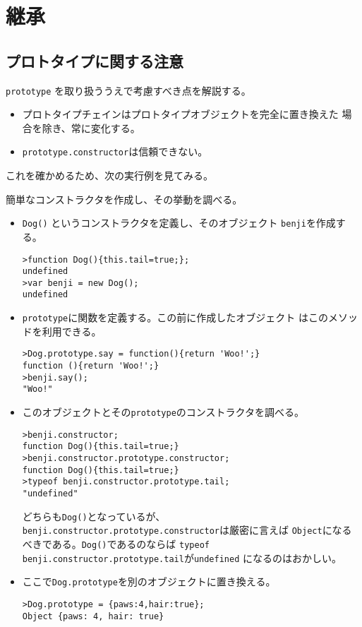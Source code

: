 \chapter{継承}
\section{プロトタイプに関する注意}
\texttt{prototype} を取り扱ううえで考慮すべき点を解説する。
\begin{itemize}
 \item プロトタイプチェインはプロトタイプオブジェクトを完全に置き換えた
       場合を除き、常に変化する。
 \item \texttt{prototype.constructor}は信頼できない。
\end{itemize}
これを確かめるため、次の実行例を見てみる。
\begin{Exec}\upshape
簡単なコンストラクタを作成し、その挙動を調べる。
\begin{itemize}
 \item \texttt{Dog()} というコンストラクタを定義し、そのオブジェクト
 \texttt{benji}を作成する。
\begin{verbatim}
>function Dog(){this.tail=true;};
undefined
>var benji = new Dog();
undefined
\end{verbatim}
 \item \texttt{prototype}に関数を定義する。この前に作成したオブジェクト
       はこのメソッドを利用できる。
\begin{verbatim}
>Dog.prototype.say = function(){return 'Woo!';}
function (){return 'Woo!';}
>benji.say();
"Woo!"
\end{verbatim}
 \item このオブジェクトとその\texttt{prototype}のコンストラクタを調べる。
\begin{verbatim}
>benji.constructor;
function Dog(){this.tail=true;}
>benji.constructor.prototype.constructor;
function Dog(){this.tail=true;}
>typeof benji.constructor.prototype.tail;
"undefined"
\end{verbatim}
どちらも\texttt{Dog()}となっているが、
       \texttt{benji.constructor.prototype.constructor}は厳密に言えば
       \texttt{Object}になるべきである。\texttt{Dog()}であるのならば
       \texttt{typeof benji.constructor.prototype.tail}が\texttt{undefined}
       になるのはおかしい。
 \item ここで\texttt{Dog.prototype}を別のオブジェクトに置き換える。
\begin{verbatim}
>Dog.prototype = {paws:4,hair:true};
Object {paws: 4, hair: true}

\end{verbatim}
\end{itemize}
\end{Exec}
